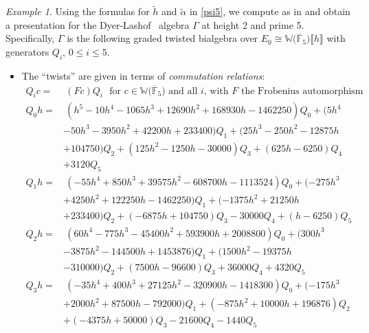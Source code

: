 \documentclass{gtpart}
\theoremstyle{definition}
\theoremstyle{remark}
\newtheorem{ex}[equation]{Example}
\newcommand{\mb}[1]{\mathbb{#1}}
\newcommand{\cF}{\overline {\mb F}}
\newcommand{\DL}{Dyer-Lashof~}
\newcommand{\BW}{{\mb W}}
\newcommand{\A}{\alpha}
\newcommand{\G}{\Gamma}
\newcommand{\lb}{\llbracket}
\newcommand{\rb}{\rrbracket}
\renewcommand{\=}{\approx}
\renewcommand{\-}{\sim}
\numberwithin{equation}{section}
\begin{document}
\begin{ex}
 \label{ex:gamma}
 Using the formulas for $\widetilde{h}$ and $\widetilde{\A}$ in \eqref{psi5}, we 
 compute as in \cite[Proposition 3.6]{p3} and obtain a presentation for the \DL 
 algebra $\G$ at height 2 and prime 5.  Specifically, $\G$ is the following 
 graded twisted bialgebra over $E_0 \cong \BW \big( \cF_5 \big) \lb h \rb$ with 
 generators $Q_i$, $0 \leq i \leq 5$.  

 \begin{itemize}
  \item The ``twists'' are given in terms of {\em commutation relations}: 
  \begin{equation*}
   \begin{split}
    Q_i c = & ~ (F c) Q_i ~~~ \text{for $c \in \BW \big( \cF_5 \big)$ and all 
              $i$, with $F$ the Frobenius automorphism} ~~ \\
    Q_0 h = & ~ (h^5 - 10 h^4 - 1065 h^3 + 12690 h^2 + 168930 h - 1462250) Q_0 + (5 h^4 \\
            & - 50 h^3 - 3950 h^2 + 42200 h + 233400) Q_1 + (25 h^3 - 250 h^2 - 12875 h \\
            & + 104750) Q_2 + (125 h^2 - 1250 h - 30000) Q_3 + (625 h - 6250) Q_4 \\
            & + 3120 Q_5 \\
    Q_1 h = & ~ (-55 h^4 + 850 h^3 + 39575 h^2 - 608700 h - 1113524) Q_0 + (-275 h^3 \\
            & + 4250 h^2 + 122250 h - 1462250) Q_1 + (-1375 h^2 + 21250 h \\
            & + 233400) Q_2 + (-6875 h + 104750) Q_3 - 30000 Q_4 + (h - 6250) Q_5 \\
    Q_2 h = & ~ (60 h^4 - 775 h^3 - 45400 h^2 + 593900 h + 2008800) Q_0 + (300 h^3 \\
            & - 3875 h^2 - 144500 h + 1453876) Q_1 + (1500 h^2 - 19375 h \\
            & - 310000) Q_2 + (7500 h - 96600) Q_3 + 36000 Q_4 + 4320 Q_5 
   \end{split}
  \end{equation*}
  \begin{equation*}
   \begin{split}
    Q_3 h = & ~ (-35 h^4 + 400 h^3 + 27125 h^2 - 320900 h - 1418300) Q_0 + (-175 h^3 \\
            & + 2000 h^2 + 87500 h - 792000) Q_1 + (-875 h^2 + 10000 h + 196876) Q_2 \\
            & + (-4375 h + 50000) Q_3 - 21600 Q_4 - 1440 Q_5 \\

\end{split}
\end{equation*}
\end{itemize}
\end{ex}
\end{document}
